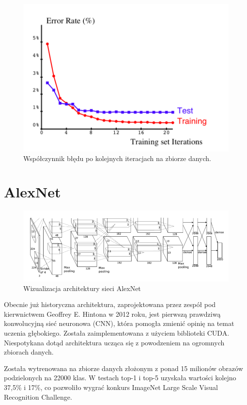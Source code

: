 \documentclass[12pt,a4paper,twoside,titlepage,openright]{book}
\begin{document}
\begin{figure}[ht]
	\centering
			\includegraphics[resolution=100, scale=0.45]{leNetTraining.png}
		\caption{Współczynnik błędu po kolejnych iteracjach na zbiorze danych.}
\end{figure}


\section{AlexNet}
\begin{figure}[ht]
	\centering
			\includegraphics[resolution=100, scale=0.65]{AlexNet.png}
		\caption{Wizualizacja architektury sieci AlexNet}
				\label{fig:alexnet}
\end{figure}

Obecnie już historyczna architektura, zaprojektowana przez zespół pod kierwnictwem Geoffrey E. Hintona w 2012 roku, jest pierwszą prawdziwą konwolucyjną sieć neuronowa (CNN), która pomogła zmienić opinię na temat uczenia głębokiego. Została zaimplementowana z użyciem biblioteki CUDA. Niespotykana dotąd architektura ucząca się z powodzeniem na ogromnych zbiorach danych.
 
 Została wytrenowana na zbiorze danych złożonym z ponad 15 milionów obrazów podzielonych na 22000 klas. 
 W testach top-1 i top-5 uzyskała wartości kolejno 37,5\% i 17\%, co pozwoliło wygrać konkurs ImageNet Large Scale Visual Recognition Challenge. 
 
\end{document}
